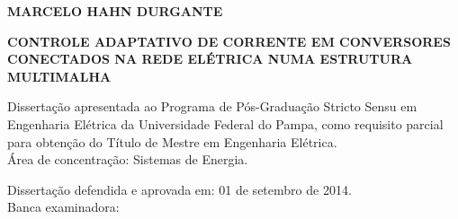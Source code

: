 
\begin{center}
	{\ABNTEXchapterfont\textbf{MARCELO HAHN DURGANTE}}

  \vspace*{\fill}\vspace*{\fill}
  {\ABNTEXchapterfont\bfseries{CONTROLE ADAPTATIVO DE CORRENTE EM CONVERSORES CONECTADOS NA REDE ELÉTRICA NUMA ESTRUTURA MULTIMALHA}}
  \vspace*{\fill}

  \hspace{.45\textwidth}
  \begin{minipage}{.5\textwidth}
    Dissertação apresentada ao Programa de Pós-Graduação Stricto Sensu em Engenharia Elétrica da Universidade Federal do Pampa, como requisito parcial para obtenção do Título de Mestre em Engenharia Elétrica.\\

    \vspace{\baselineskip}
    Área de concentração: Sistemas de Energia.
  \end{minipage}%
  \vspace*{\fill}
\end{center}

\begin{center}
  Dissertação defendida e aprovada em: 01 de setembro de 2014.\\
  Banca examinadora:
\end{center}


